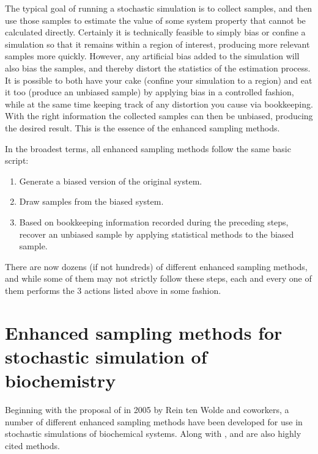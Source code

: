 The typical goal of running a stochastic simulation is to collect samples, and then use those samples to estimate the value of some system property that cannot be calculated directly. Certainly it is technically feasible to simply bias or confine a simulation so that it remains within a region of interest, producing more relevant samples more quickly. However, any artificial bias added to the simulation will also bias the samples, and thereby distort the statistics of the estimation process. It is possible to both have your cake (confine your simulation to a region) and eat it too (produce an unbiased sample) by applying bias in a controlled fashion, while at the same time keeping track of any distortion you cause via bookkeeping. With the right information the collected samples can then be unbiased, producing the desired result. This is the essence of the enhanced sampling methods.

In the broadest terms, all enhanced sampling methods follow the same basic script:
\begin{enumerate}
    \item Generate a biased version of the original system.
    \item Draw samples from the biased system.
    \item Based on bookkeeping information recorded during the preceding steps, recover an unbiased sample by applying statistical methods to the biased sample. 
\end{enumerate}
There are now dozens (if not hundreds) of different enhanced sampling methods, and while some of them may not strictly follow these steps, each and every one of them performs the 3 actions listed above in some fashion.

\section{Enhanced sampling methods for stochastic simulation of biochemistry}

Beginning with the proposal of  in 2005\supercite{Allen:2005wy} by Rein ten Wolde and coworkers, a number of different enhanced sampling methods have been developed for use in stochastic simulations of biochemical systems. Along with ,  and  are also highly cited methods.

